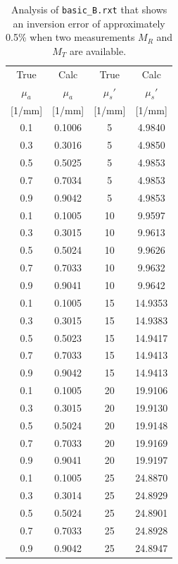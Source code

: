 \documentclass{article}
\begin{document}
\begin{table}[p]
\begin{center}
\begin{tabular}{cc|cc}
True & Calc & True & Calc\\
$\mu_a$ & $\mu_a$ & $\mu_s'$ & $\mu_s'$\\
\hbox{}[1/mm] & [1/mm] & [1/mm] & [1/mm]  \\
\hline
0.1 & 0.1006 & 5  & 4.9840  \\
0.3 & 0.3016 & 5  & 4.9850  \\
0.5 & 0.5025 & 5  & 4.9853 \\
0.7 & 0.7034 & 5  & 4.9853  \\
0.9 & 0.9042 & 5  & 4.9853  \\[2mm]
0.1 & 0.1005 & 10 & 9.9597  \\
0.3 & 0.3015 & 10 & 9.9613  \\
0.5 & 0.5024 & 10 & 9.9626  \\
0.7 & 0.7033 & 10 & 9.9632  \\
0.9 & 0.9041 & 10 & 9.9642  \\[2mm]
0.1 & 0.1005 & 15 & 14.9353  \\
0.3 & 0.3015 & 15 & 14.9383  \\
0.5 & 0.5023 & 15 & 14.9417  \\
0.7 & 0.7033 & 15 & 14.9413  \\
0.9 & 0.9042 & 15 & 14.9413  \\[2mm]
0.1 & 0.1005 & 20 & 19.9106  \\
0.3 & 0.3015 & 20 & 19.9130  \\
0.5 & 0.5024 & 20 & 19.9148 \\
0.7 & 0.7033 & 20 & 19.9169  \\
0.9 & 0.9041 & 20 & 19.9197  \\[2mm]
0.1 & 0.1005 & 25 & 24.8870  \\
0.3 & 0.3014 & 25 & 24.8929  \\
0.5 & 0.5024 & 25 & 24.8901  \\
0.7 & 0.7033 & 25 & 24.8928  \\
0.9 & 0.9042 & 25 & 24.8947  \\
\end{tabular}
\end{center}
\caption{Analysis of \texttt{basic\_B.rxt} that shows an inversion error
of approximately 0.5\% when two measurements $M_R$ and $M_T$
are available. }
\end{table}
\end{document}
